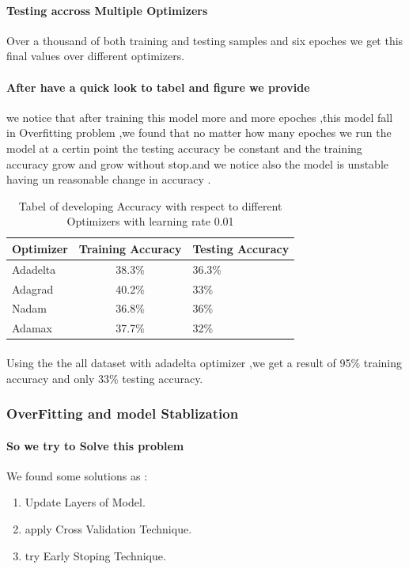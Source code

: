 \paragraph{Testing accross Multiple Optimizers}
Over a thousand of both training and testing samples and six epoches we get this final values over different optimizers.
\paragraph{After have a quick look to tabel and figure we provide}
we notice that after training this model more and more epoches ,this model fall in Overfitting problem ,we found that no matter how many epoches we run the model at a certin point the testing accuracy be constant and the training accuracy grow and grow without stop.and we notice also the model is unstable having un reasonable change in accuracy . 
\begin{table}[h!]
	\begin{center}
		\caption{Tabel of developing Accuracy with respect to different Optimizers with learning rate 0.01 \newline}
		\begin{tabular}{l|c|l}
			\textbf{Optimizer} & \textbf{Training Accuracy} & \textbf{Testing Accuracy}\\ 
			\hline 
			Adadelta & 38.3\% & 36.3\% \\
			Adagrad & 40.2\% & 33\%\\
			Nadam & 36.8\% & 36\% \\
			Adamax & 37.7\% & 32\% \\
		\end{tabular}
	\end{center}
\end{table}
\paragraph{}
Using the the all dataset with adadelta optimizer ,we get a result of 95\% training accuracy and only 33\% testing accuracy.
\subsubsection{OverFitting and model Stablization}
\paragraph{So we try to Solve this problem }
We found some solutions as :
\begin{enumerate}
	\item Update Layers of Model.
	\item apply Cross Validation Technique.
	\item try Early Stoping Technique.
\end{enumerate}

